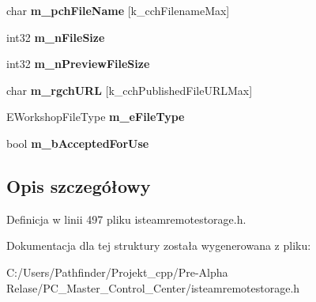 \begin{DoxyCompactItemize}
char {\bfseries m\+\_\+pch\+File\+Name} \mbox{[}k\+\_\+cch\+Filename\+Max\mbox{]}
\item 
\mbox{\label{struct_remote_storage_get_published_file_details_result__t_a58703e19ebeb6179c29b590ffdf611c8}} 
int32 {\bfseries m\+\_\+n\+File\+Size}
\item 
\mbox{\label{struct_remote_storage_get_published_file_details_result__t_a96265c14a0a5a291ef4ed910c3f9a81b}} 
int32 {\bfseries m\+\_\+n\+Preview\+File\+Size}
\item 
\mbox{\label{struct_remote_storage_get_published_file_details_result__t_a637b2b0c2260fd13cb55fbe5c6de22b8}} 
char {\bfseries m\+\_\+rgch\+U\+RL} \mbox{[}k\+\_\+cch\+Published\+File\+U\+R\+L\+Max\mbox{]}
\item 
\mbox{\label{struct_remote_storage_get_published_file_details_result__t_a9a561bba9106d99d4278cb3bbe1a98b7}} 
E\+Workshop\+File\+Type {\bfseries m\+\_\+e\+File\+Type}
\item 
\mbox{\label{struct_remote_storage_get_published_file_details_result__t_a7c8468d3f88dfc9339f315104d8b9be5}} 
bool {\bfseries m\+\_\+b\+Accepted\+For\+Use}
\end{DoxyCompactItemize}


\subsection{Opis szczegółowy}


Definicja w linii 497 pliku isteamremotestorage.\+h.



Dokumentacja dla tej struktury została wygenerowana z pliku\+:\begin{DoxyCompactItemize}
\item 
C\+:/\+Users/\+Pathfinder/\+Projekt\+\_\+cpp/\+Pre-\/\+Alpha Relase/\+P\+C\+\_\+\+Master\+\_\+\+Control\+\_\+\+Center/isteamremotestorage.\+h\end{DoxyCompactItemize}
